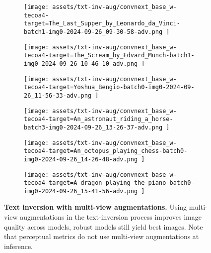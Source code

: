\begin{figure*}[t]
    \vspace{1mm}
    \begin{minipage}[t]{.025\textwidth}
         \vspace{9mm}
    \end{minipage}%
    \begin{minipage}[t]{.98\textwidth}
        \vspace{0pt}
            \begin{subfigure}[t]{0.16\textwidth}
                    \texttt{[image:  assets/txt-inv-aug/convnext\_base\_w-tecoa4-target=The\_Last\_Supper\_by\_Leonardo\_da\_Vinci-batch1-img0-2024-09-26\_09-30-58-adv.png ]}
            \end{subfigure}%
                \hspace{0.5mm}%
            \begin{subfigure}[t]{0.16\textwidth}
                    \texttt{[image:  assets/txt-inv-aug/convnext\_base\_w-tecoa4-target=The\_Scream\_by\_Edvard\_Munch-batch1-img0-2024-09-26\_10-46-10-adv.png ]}
            \end{subfigure}%
                \hspace{0.5mm}%
            \begin{subfigure}[t]{0.16\textwidth}
                    \texttt{[image:  assets/txt-inv-aug/convnext\_base\_w-tecoa4-target=Yoshua\_Bengio-batch0-img0-2024-09-26\_11-56-33-adv.png ]}
            \end{subfigure}%
                \hspace{0.5mm}%
            \begin{subfigure}[t]{0.16\textwidth}
                    \texttt{[image:  assets/txt-inv-aug/convnext\_base\_w-tecoa4-target=An\_astronaut\_riding\_a\_horse-batch3-img0-2024-09-26\_13-26-37-adv.png ]}
            \end{subfigure}%
                \hspace{0.5mm}%
            \begin{subfigure}[t]{0.16\textwidth}
                    \texttt{[image:  assets/txt-inv-aug/convnext\_base\_w-tecoa4-target=An\_octopus\_playing\_chess-batch0-img0-2024-09-26\_14-26-48-adv.png ]}
            \end{subfigure}%
                \hspace{0.5mm}%
            \begin{subfigure}[t]{0.16\textwidth}
                    \texttt{[image:  assets/txt-inv-aug/convnext\_base\_w-tecoa4-target=A\_dragon\_playing\_the\_piano-batch0-img0-2024-09-26\_15-41-56-adv.png ]}
            \end{subfigure}%
    \end{minipage}

    \vspace{1ex}
\caption{\textbf{Text inversion with multi-view augmentations.} Using multi-view augmentations in the text-inversion process improves image quality across models, robust models still yield best images.
Note that perceptual metrics do not use multi-view augmentations at inference.}
\label{fig:text-inv-aug}
\end{figure*}